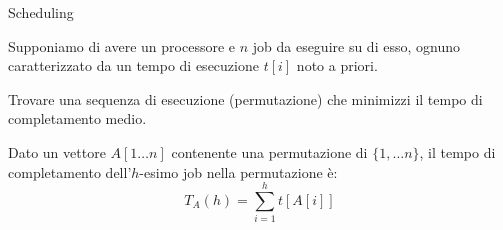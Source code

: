 \begin{frame}{Scheduling}

\vspace{-6pt}
\begin{myboxtitle}[Input]
	
Supponiamo di avere un processore e $n$ job da eseguire su di esso,
ognuno caratterizzato da un tempo di esecuzione $t[i]$ noto a priori.
\end{myboxtitle}

\begin{myboxtitle}[Problema]
Trovare una sequenza di esecuzione (permutazione) che minimizzi il \alert{tempo di completamento medio}.
\end{myboxtitle}

\begin{myboxtitle}

Dato un vettore $A[1 \ldots n]$ contenente una	permutazione di $\{ 1, \ldots n \}$,
il \alert{tempo di completamento} dell'$h$-esimo job nella permutazione è:
\[
  T_A(h) = \sum_{i=1}^h t[A[i]]
\] 
\end{myboxtitle}

\end{frame}	

